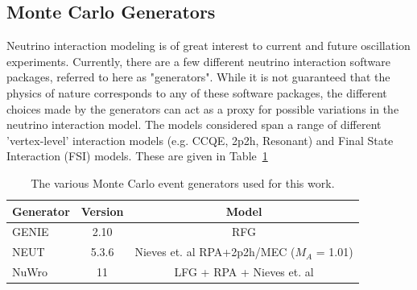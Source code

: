 \documentclass[12pt]{article}
\begin{document}
\subsection{Monte Carlo Generators}
\label{subsec:gen}
Neutrino interaction modeling is of great interest to current and future oscillation experiments. Currently, there are a few different neutrino interaction software packages, referred to here as "generators". While it is not guaranteed that the physics of nature corresponds to any of these software packages, the different choices made by the generators can act as a proxy for possible variations in the neutrino interaction model. The models considered span a range of different 'vertex-level' interaction models (e.g. CCQE, 2p2h, Resonant) and Final State Interaction (FSI) models. These are given in Table~\ref{tab:gens}



\begin{table}
\centering
 \begin{tabular}{| l  c  c |} 
 \hline
 Generator & Version & Model\\ [0.5ex] 
 \hline
 GENIE\cite{GENIE} & 2.10 & RFG \\ 
 NEUT\cite{NEUT} & 5.3.6 & Nieves et. al RPA+2p2h/MEC ($M_A$ = 1.01) \\
 NuWro\cite{NUWRO} & 11 & LFG + RPA + Nieves et. al \\[1ex]
 \hline
\end{tabular}
\caption{The various Monte Carlo event generators used for this work.}
\label{tab:gens}
\end{table}

\end{document}
